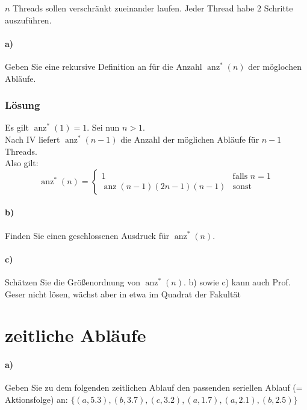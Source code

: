 \documentclass[a4paper]{scrartcl}
\DeclareMathOperator{\anz}{anz}
\begin{document}
$n $ Threads sollen verschränkt zueinander laufen. Jeder Thread habe $ 2 $ Schritte auszuführen.

\paragraph{a)} Geben Sie eine rekursive Definition an für die Anzahl $ \anz^*(n) $ der möglochen Abläufe.

\subsubsection*{Lösung}
Es gilt $ \anz^*(1) = 1 $. Sei nun $ n > 1 $.\\
Nach IV liefert $ \anz^*(n - 1) $ die Anzahl der möglichen Abläufe für $ n - 1 $ Threads.\\



Also gilt:\\
\begin{equation*}
\anz^*(n) = 
\begin{cases}
1 & \text{falls } n = 1\\
\anz(n - 1) (2n - 1) (n - 1) & \text{sonst}
\end{cases}
\end{equation*}



\paragraph{b)} Finden Sie einen geschlossenen Ausdruck für $ \anz^*(n) $.
\paragraph{c)} Schätzen Sie die Größenordnung von $ \anz^*(n) $.
b) sowie c) kann auch Prof. Geser nicht lösen, wächst aber in etwa im Quadrat der Fakultät


\section{zeitliche Abläufe}

\paragraph{a)} Geben Sie zu dem folgenden zeitlichen Ablauf den passenden seriellen Ablauf (= Aktionsfolge) an:
$ \{(a, 5.3), (b, 3.7), (c, 3.2), (a, 1.7), (a, 2.1), (b, 2.5)\}$
\end{document}
